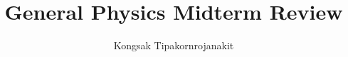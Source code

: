 \documentclass{article}
\begin{document}
	
\title{General Physics Midterm Review}
\author{Kongsak Tipakornrojanakit}
\date{}
\maketitle


	
%
%
\end{document}
